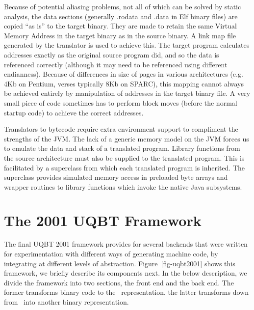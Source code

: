 Because of potential aliasing problems, not all of which can be solved by
static analysis, the data sections (generally .rodata and .data in 
Elf binary files) are copied ``as is'' to the target binary. 
They are made to retain the same Virtual Memory Address in the 
target binary as in the source binary. A link map file generated by 
the translator is used to achieve this. The target program calculates 
addresses exactly as the original source program did, and so the data 
is referenced correctly (although it may need to be referenced 
using different endianness). 
Because of differences in size of pages in various architectures 
(e.g. 4Kb on Pentium, verses typically 8Kb on SPARC), this mapping 
cannot always be achieved entirely by manipulation of addresses in the 
target binary file. A very small piece of code sometimes has to perform block 
moves (before the normal startup code) to achieve the correct addresses.

Translators to bytecode require extra environment support
to compliment the strengths of the JVM.  The lack of a generic memory
model on the JVM forces us to emulate the data and stack of a translated
program.  Library functions from the source architecture must also be
supplied to the translated program.  This is facilitated by a superclass
from which each translated program is inherited.  The superclass provides
simulated memory access in preloaded byte arrays and wrapper routines to 
library functions which invoke the native Java subsystems.


\section{The 2001 UQBT Framework}
\label{sec-2001framework}


The final UQBT 2001 framework provides for several backends that 
were written for experimentation with different ways of generating 
machine code, by integrating at different levels of abstraction. 
Figure~\ref{fig-uqbt2001} shows this framework, we briefly describe
its components next.  In the below description, we divide the framework 
into two sections, the front end and the back end.  The former transforms
binary code to the \hrtl\ representation, the latter transforms down 
from \hrtl\ into another binary representation.

